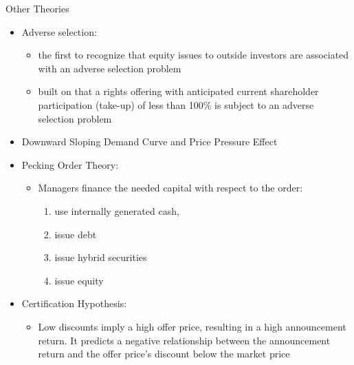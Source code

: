 \documentclass{beamer}
\begin{document}
\begin{frame}{Other Theories}
	\begin{itemize}\tiny
		\item Adverse selection: 
		\begin{itemize}
			\tiny
			\item \cite{myers1984corporate} the first to recognize that equity issues to outside investors are associated with an adverse selection problem
			\item \cite{ECKBO1992293}  built on that a rights
			offering with anticipated current shareholder participation (take-up) of less than 100\% is subject to an adverse selection problem
		\end{itemize}
		\item  Downward Sloping Demand Curve and Price Pressure
		Effect
		\item  Pecking Order Theory:
		\begin{itemize}
			\tiny \item  Managers finance
			the needed capital with respect to the order:\begin{enumerate}\tiny
				\item use internally generated cash, \item issue
			debt \item issue hybrid securities \item issue equity
			\end{enumerate}
		\end{itemize}
		\item Certification Hypothesis:
		\begin{itemize}\tiny
			\item Low discounts imply a
			high offer price, resulting in a high announcement return. It predicts a negative
			relationship between the announcement return and the offer price’s discount below the
			market price
		\end{itemize}
	\end{itemize}
\end{frame}
\end{document}

